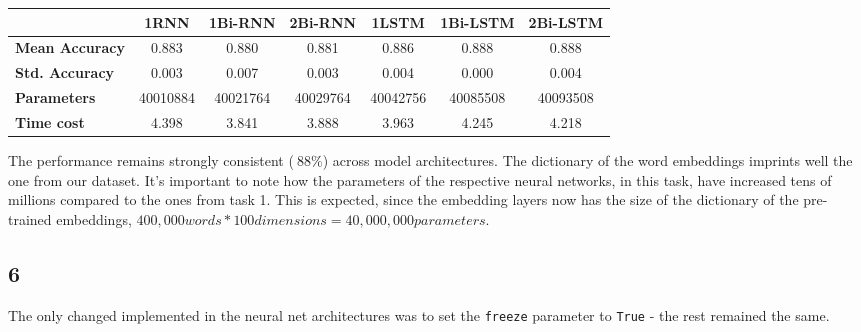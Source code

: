 \documentclass[8pt,a4paper]{report}%
\begin{document}
\begin{table}[H]
\begin{tabular}{|l|c|c|c|c|c|c|}
\hline
\multicolumn{1}{|c|}{\textbf{}} & \textbf{1RNN} & \textbf{1Bi-RNN} & \textbf{2Bi-RNN} & \textbf{1LSTM} & \textbf{1Bi-LSTM} & \textbf{2Bi-LSTM} \\ \hline
\textbf{Mean Accuracy}          & 0.883         & 0.880            & 0.881            & 0.886          & 0.888             & 0.888             \\ \hline
\textbf{Std. Accuracy}          & 0.003         & 0.007            & 0.003            & 0.004          & 0.000             & 0.004             \\ \hline
\textbf{Parameters}             & 40010884      & 40021764         & 40029764         & 40042756       & 40085508          & 40093508          \\ \hline
\textbf{Time cost}              & 4.398         & 3.841            & 3.888            & 3.963          & 4.245             & 4.218             \\ \hline
\end{tabular}
\end{table}

The performance remains strongly consistent ($~88\%$) across model architectures. The dictionary of the word embeddings imprints well the one from our dataset. It's important to note how the parameters of the respective neural networks, in this task, have increased tens of millions compared to the ones from task 1. This is expected, since the embedding layers now has the size of the dictionary of the pre-trained embeddings, $400,000 words * 100 dimensions = 40,000,000 parameters$.


\subsection*{6}

The only changed implemented in the neural net architectures was to set the \lstinline{freeze} parameter to \lstinline{True} - the rest remained the same.
\end{document}
